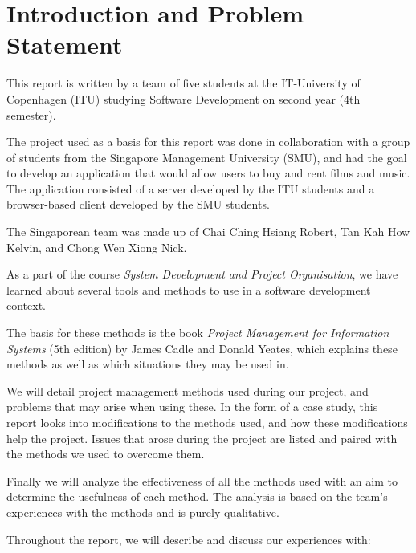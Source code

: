 \section{Introduction and Problem Statement}

This report is written by a team of five students at the IT-University of
Copenhagen (ITU) studying Software Development on second year (4th semester).

The project used as a basis for this report was done in collaboration with a
group of students from the Singapore Management University (SMU), and had the
goal to develop an application that would allow users to buy and rent films and
music. The application consisted of a server developed by the ITU students and
a browser-based client developed by the SMU students.

The Singaporean team was made up of Chai Ching Hsiang Robert, Tan Kah How
Kelvin, and Chong Wen Xiong Nick.

As a part of the course \emph{System Development and Project Organisation}, we
have learned about several tools and methods to use in a software development
context.

The basis for these methods is the book \emph{Project Management for
Information Systems} (5th edition) by James Cadle and Donald Yeates, which
explains these methods as well as which situations they may be used in.

We will detail project management methods used during our project, and problems
that may arise when using these. In the form of a case study, this report looks
into modifications to the methods used, and how these modifications help the
project. Issues that arose during the project are listed and paired with the
methods we used to overcome them.

Finally we will analyze the effectiveness of all the methods used with an aim
to determine the usefulness of each method. The analysis is based on the team’s
experiences with the methods and is purely qualitative.

Throughout the report, we will describe and discuss our experiences with:

